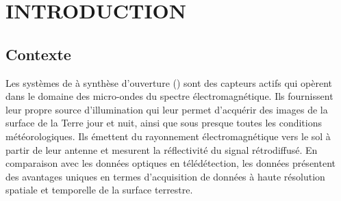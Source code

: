 \chapter{INTRODUCTION}

\section{Contexte}


Les systèmes de \acrcradar à synthèse d’ouverture (\acrsarns) sont des capteurs actifs qui opèrent dans le domaine des micro-ondes du spectre électromagnétique. Ils fournissent leur propre source d’illumination qui leur permet d’acquérir des images de la surface de la Terre jour et nuit, ainsi que sous presque toutes les conditions météorologiques. Ils émettent du rayonnement électromagnétique vers le sol à partir de leur antenne et mesurent la réflectivité du signal rétrodiffusé. En comparaison avec les données optiques en télédétection, les données \acrsar présentent des avantages uniques en termes d’acquisition de données à haute résolution spatiale et temporelle de la surface terrestre. 

